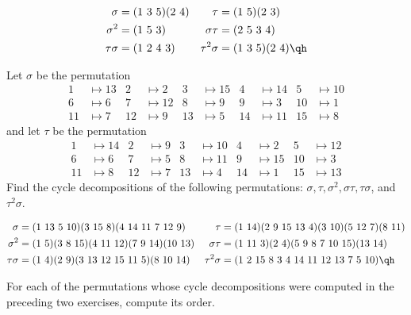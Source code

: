 \begin{sol}
    \begin{align*}
        \sigma & = (1\ 3\ 5)(2\ 4) & \tau & = (1\ 5)(2\ 3) \\
        \sigma^2 & = (1\ 5\ 3) & \sigma\tau & = (2\ 5\ 3\ 4)\\
        \tau\sigma & = (1\ 2\ 4\ 3) & \tau^2\sigma & = (1\ 3\ 5)(2\ 4) \qh
    \end{align*}
\end{sol}

\begin{exercise} \label{ex1.3.2} 
    Let $\sigma$ be the permutation
    \begin{align*}
        1 &\mapsto 13 & 2 &\mapsto 2 & 3 & \mapsto 15 & 4 & \mapsto 14 & 5 & \mapsto 10  \\
        6 &\mapsto 6 & 7 &\mapsto 12 & 8 & \mapsto 9 & 9 & \mapsto 3 & 10 & \mapsto 1 \\
        11 &\mapsto 7 & 12 &\mapsto 9 & 13 & \mapsto 5 & 14 & \mapsto 11 & 15 & \mapsto 8
    \end{align*}
    and let $\tau$ be the permutation
    \begin{align*}
        1 &\mapsto 14 & 2 &\mapsto 9 & 3 &\mapsto 10 & 4 &\mapsto 2 & 5 &\mapsto 12 \\
        6 &\mapsto 6 & 7 &\mapsto 5 & 8 &\mapsto 11 & 9 &\mapsto 15 & 10 &\mapsto 3 \\
        11 &\mapsto 8 & 12 &\mapsto 7 & 13 &\mapsto 4 & 14 &\mapsto 1 & 15 &\mapsto 13
    \end{align*}
    Find the cycle decompositions of the following permutations: $\sigma, \tau, \sigma^2, \sigma\tau, \tau\sigma$, and $\tau^2\sigma.$
\end{exercise}

\begin{sol}
    \begin{align*}
        \sigma & = (1\ 13\ 5\ 10)(3\ 15\ 8)(4\ 14\ 11\ 7\ 12\ 9) & \tau & = (1\ 14)(2\ 9\ 15\ 13\ 4)(3\ 10)(5\ 12\ 7)(8\ 11) \\
        \sigma^2 & = (1\ 5)(3\ 8\ 15)(4\ 11\ 12)(7\ 9\ 14)(10\ 13) & \sigma\tau & = (1\ 11\ 3)(2\ 4)(5\ 9\ 8\ 7\ 10\ 15)(13\ 14) \\
        \tau\sigma & = (1\ 4)(2\ 9)(3\ 13\ 12\ 15\ 11\ 5)(8\ 10\ 14) & \tau^2\sigma & = (1\ 2\ 15\ 8\ 3\ 4\ 14\ 11\ 12\ 13\ 7\ 5\ 10) \qh
    \end{align*}
\end{sol}

\begin{exercise}\label{ex1.3.3}
    For each of the permutations whose cycle decompositions were computed in the preceding two exercises, compute its order.
\end{exercise}

